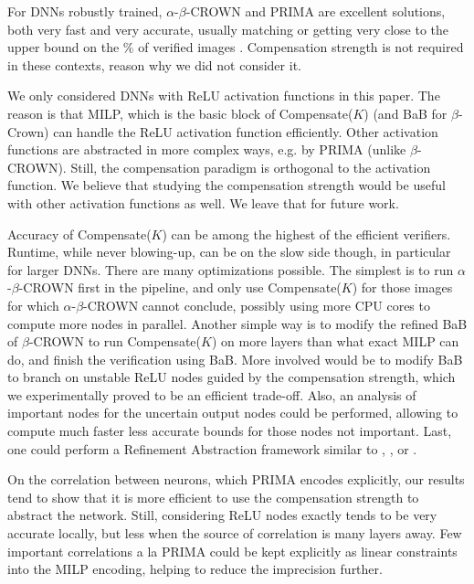 \documentclass{llncs}
\begin{document}
For DNNs robustly trained, $\alpha$-$\beta$-CROWN and PRIMA are excellent solutions, both very fast and very accurate, usually matching or getting very close \cite{crown} to the upper bound on the $\%$ of verified images \cite{attack}. Compensation strength is not required in these contexts, reason why we did not consider it.

We only considered DNNs with ReLU activation functions in this paper. The reason is that MILP, which is the basic block of Compensate($K$) (and BaB for $\beta$-Crown) can handle the ReLU activation function efficiently. Other activation functions are abstracted in more complex ways, e.g. by PRIMA (unlike $\beta$-CROWN). Still, the compensation paradigm is  orthogonal to the activation function. We believe that studying the compensation strength would be useful with other activation functions as well. We leave that for future work. 

Accuracy of Compensate($K$) can be among the highest of the efficient verifiers.
Runtime, while never blowing-up, can be on the slow side though, in particular for larger DNNs. There are many optimizations possible. The simplest is to run $\alpha$-$\beta$-CROWN first in the pipeline, and only use Compensate($K$) for those images for which $\alpha$-$\beta$-CROWN cannot conclude, possibly using more CPU cores to compute more nodes in parallel. Another simple way is to modify the refined BaB of $\beta$-CROWN to run Compensate($K$) on more layers than what exact MILP can do, and finish the verification using BaB. More involved would be to modify BaB to branch on unstable ReLU nodes guided by the compensation strength, which we experimentally proved to be an efficient trade-off. Also, an analysis of important nodes for the uncertain output nodes could be performed, allowing to compute much faster less accurate bounds for those nodes not important. Last, one could perform a Refinement Abstraction framework similar to \cite{atva}, \cite{elboher}, or \cite{SRGR}.

On the correlation between neurons, which PRIMA encodes explicitly, our results tend to show that it is more efficient to use the compensation strength to abstract the network. Still, considering ReLU nodes exactly tends to be very accurate locally, but less when the source of correlation is many layers away. Few important correlations a la PRIMA could be kept explicitly as linear constraints into the MILP encoding, helping to reduce the imprecision further.
\end{document}
